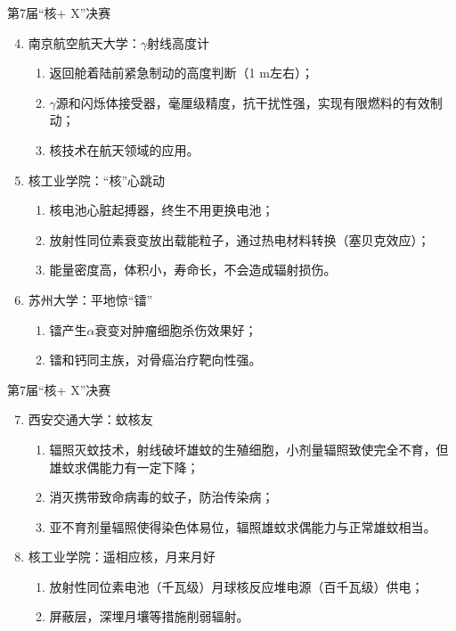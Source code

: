 \documentclass{ctexbeamer}
\begin{document}
\begin{frame}{第7届“核+ X”决赛}
    \begin{enumerate}\setcounter{enumi}{3}
        \item 南京航空航天大学：$\gamma$射线高度计
        \begin{enumerate}
            \item 返回舱着陆前紧急制动的高度判断（1 m左右）；
            \item $\gamma$源和闪烁体接受器，毫厘级精度，抗干扰性强，实现有限燃料的有效制动；
            \item 核技术在航天领域的应用。
        \end{enumerate}
        \item 核工业学院：“核”心跳动
        \begin{enumerate}
            \item 核电池心脏起搏器，终生不用更换电池；
            \item 放射性同位素衰变放出载能粒子，通过热电材料转换（塞贝克效应）；
            \item 能量密度高，体积小，寿命长，不会造成辐射损伤。
        \end{enumerate}
        \item 苏州大学：平地惊“镭”
        \begin{enumerate}
            \item 镭产生$\alpha$衰变对肿瘤细胞杀伤效果好；
            \item 镭和钙同主族，对骨癌治疗靶向性强。
        \end{enumerate}
    \end{enumerate}
\end{frame}

\begin{frame}{第7届“核+ X”决赛}
    \begin{enumerate}\setcounter{enumi}{6}
        \item 西安交通大学：蚊核友
        \begin{enumerate}
            \item 辐照灭蚊技术，射线破坏雄蚊的生殖细胞，小剂量辐照致使完全不育，但雄蚊求偶能力有一定下降；
            \item 消灭携带致命病毒的蚊子，防治传染病；
            \item 亚不育剂量辐照使得染色体易位，辐照雄蚊求偶能力与正常雄蚊相当。
        \end{enumerate}
        \item 核工业学院：遥相应核，月来月好
        \begin{enumerate}
            \item 放射性同位素电池（千瓦级）月球核反应堆电源（百千瓦级）供电；
            \item 屏蔽层，深埋月壤等措施削弱辐射。
        \end{enumerate}
    \end{enumerate}
\end{frame}
\end{document}
